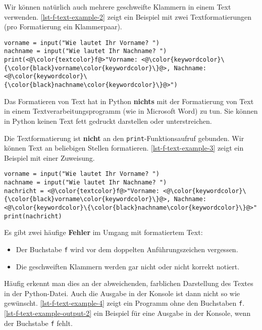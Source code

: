 Wir können natürlich auch mehrere geschweifte Klammern in einem Text verwenden. \autoref{lst-f-text-example-2} zeigt ein Beispiel mit zwei Textformatierungen (pro Formatierung ein Klammerpaar). 

\begin{lstlisting}[caption={Beide Variablennamen werden während der Ausführung durch den gespeicherten Inhalt ersetzt. (\graybgtexttt{f-text\_bsp\_2.py}).}, label={lst-f-text-example-2}]
vorname = input("Wie lautet Ihr Vorname? ")
nachname = input("Wie lautet Ihr Nachname? ")
print(<@\color{textcolor}f@>"Vorname: <@\color{keywordcolor}\{\color{black}vorname\color{keywordcolor}\}@>, Nachname: <@\color{keywordcolor}\{\color{black}nachname\color{keywordcolor}\}@>")
\end{lstlisting}

\begin{important}
	Das Formatieren von Text hat in Python \textbf{nichts} mit der Formatierung von Text in einem Textverarbeitungsprogramm (wie in Microsoft Word) zu tun. Sie können in Python keinen Text fett gedruckt darstellen oder unterstreichen. 
\end{important}

Die Textformatierung ist \textbf{nicht} an den \lstinline{print}-Funktionsaufruf gebunden. Wir können Text an beliebigen Stellen formatieren. \autoref{lst-f-text-example-3} zeigt ein Beispiel mit einer Zuweisung.

\begin{lstlisting}[caption={Formatierter Text in Kombination mit einer Zuweisung (\graybgtexttt{f-text\_bsp\_3.py}).}, label={lst-f-text-example-3}]
vorname = input("Wie lautet Ihr Vorname? ")
nachname = input("Wie lautet Ihr Nachname? ")
nachricht = <@\color{textcolor}f@>"Vorname: <@\color{keywordcolor}\{\color{black}vorname\color{keywordcolor}\}@>, Nachname: <@\color{keywordcolor}\{\color{black}nachname\color{keywordcolor}\}@>"
print(nachricht)
\end{lstlisting}

Es gibt zwei häufige \textbf{Fehler} im Umgang mit formatiertem Text:

\begin{itemize}
	\item Der Buchstabe \lstinline{f} wird vor dem doppelten Anführungszeichen vergessen.
	\item Die geschweiften Klammern werden gar nicht oder nicht korrekt notiert.
\end{itemize}

Häufig erkennt man dies an der abweichenden, farblichen Darstellung des Textes in der Python-Datei. Auch die Ausgabe in der Konsole ist dann nicht so wie gewünscht. \autoref{lst-f-text-example-4} zeigt ein Programm ohne den Buchstaben \lstinline{f}. \autoref{lst-f-text-example-output-2} ein Beispiel für eine Ausgabe in der Konsole, wenn der Buchstabe \lstinline{f} fehlt.

